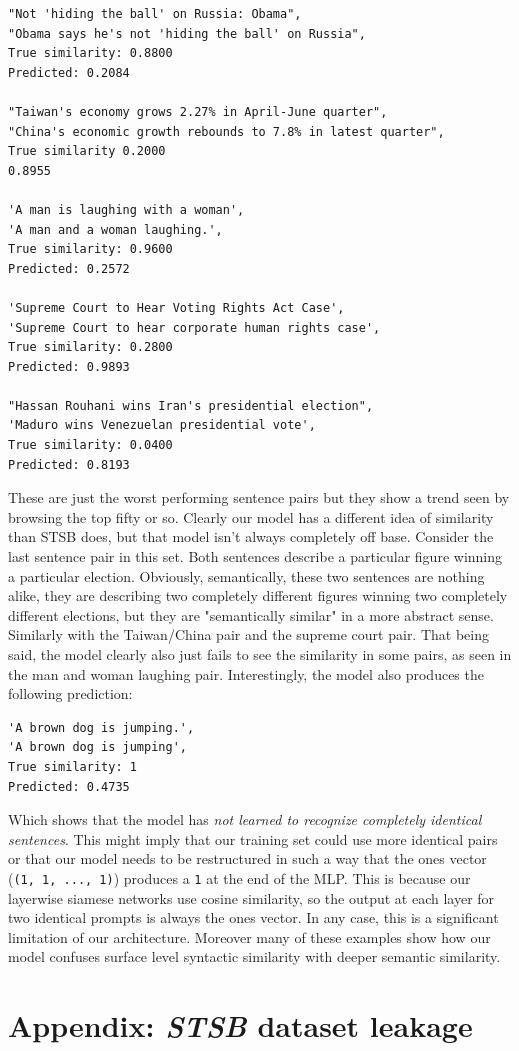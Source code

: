 \documentclass{article}
\begin{document}
\begin{verbatim}
"Not 'hiding the ball' on Russia: Obama",
"Obama says he's not 'hiding the ball' on Russia",
True similarity: 0.8800
Predicted: 0.2084

"Taiwan's economy grows 2.27% in April-June quarter",
"China's economic growth rebounds to 7.8% in latest quarter",
True similarity 0.2000
0.8955

'A man is laughing with a woman',
'A man and a woman laughing.',
True similarity: 0.9600
Predicted: 0.2572

'Supreme Court to Hear Voting Rights Act Case',
'Supreme Court to hear corporate human rights case',
True similarity: 0.2800
Predicted: 0.9893

"Hassan Rouhani wins Iran's presidential election",
'Maduro wins Venezuelan presidential vote',
True similarity: 0.0400
Predicted: 0.8193
\end{verbatim}
These are just the worst performing sentence pairs but they show a trend seen by browsing the top fifty or so. Clearly our model has a different idea of similarity than STSB does, but that model isn't always completely off base. Consider the last sentence pair in this set. Both sentences describe a particular figure winning a particular election. Obviously, semantically, these two sentences are nothing alike, they are describing two completely different figures winning two completely different elections, but they are "semantically similar" in a more abstract sense. Similarly with the Taiwan/China pair and the supreme court pair. That being said, the model clearly also just fails to see the similarity in some pairs, as seen in the man and woman laughing pair. Interestingly, the model also produces the following prediction:
\begin{verbatim}
'A brown dog is jumping.',
'A brown dog is jumping',
True similarity: 1
Predicted: 0.4735
\end{verbatim}
Which shows that the model has \textit{not learned to recognize completely identical sentences}. This might imply that our training set could use more identical pairs or that our model needs to be restructured in such a way that the ones vector (\verb|(1, 1, ..., 1)|) produces a \verb|1| at the end of the MLP. This is because our layerwise siamese networks use cosine similarity, so the output at each layer for two identical prompts is always the ones vector. In any case, this is a significant limitation of our architecture. Moreover many of these examples show how our model confuses surface level syntactic similarity with deeper semantic similarity.

\newpage
\section{Appendix: \textit{STSB} dataset leakage} 
\newpage
{}

\end{document}
